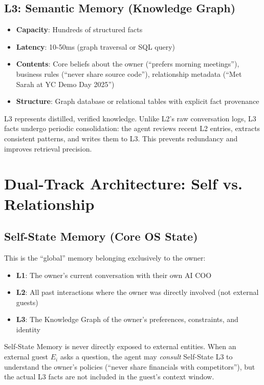 \subsection{L3: Semantic Memory (Knowledge Graph)}

\begin{itemize}
    \item \textbf{Capacity}: Hundreds of structured facts
    \item \textbf{Latency}: 10-50ms (graph traversal or SQL query)
    \item \textbf{Contents}: Core beliefs about the owner (``prefers morning meetings''), business rules (``never share source code''), relationship metadata (``Met Sarah at YC Demo Day 2025'')
    \item \textbf{Structure}: Graph database or relational tables with explicit fact provenance
\end{itemize}

L3 represents distilled, verified knowledge. Unlike L2's raw conversation logs, L3 facts undergo periodic consolidation: the agent reviews recent L2 entries, extracts consistent patterns, and writes them to L3. This prevents redundancy and improves retrieval precision.

\section{Dual-Track Architecture: Self vs. Relationship}

\subsection{Self-State Memory (Core OS State)}

This is the ``global'' memory belonging exclusively to the owner:

\begin{itemize}
    \item \textbf{L1}: The owner's current conversation with their own AI COO
    \item \textbf{L2}: All past interactions where the owner was directly involved (not external guests)
    \item \textbf{L3}: The Knowledge Graph of the owner's preferences, constraints, and identity
\end{itemize}

Self-State Memory is never directly exposed to external entities. When an external guest $E_i$ asks a question, the agent may \textit{consult} Self-State L3 to understand the owner's policies (``never share financials with competitors''), but the actual L3 facts are not included in the guest's context window.

